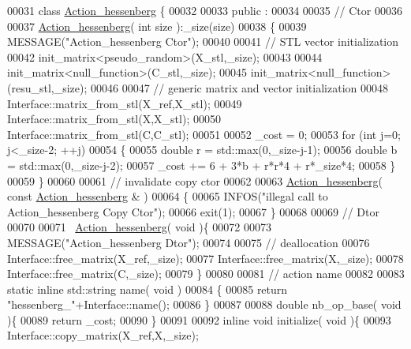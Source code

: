 \begin{DoxyCode}
00031 \textcolor{keyword}{class }\hyperlink{class_action__hessenberg}{Action\_hessenberg} \{
00032 
00033 public :
00034 
00035   \textcolor{comment}{// Ctor}
00036 
00037   \hyperlink{class_action__hessenberg}{Action\_hessenberg}( \textcolor{keywordtype}{int} size ):\_size(size)
00038   \{
00039     MESSAGE(\textcolor{stringliteral}{"Action\_hessenberg Ctor"});
00040 
00041     \textcolor{comment}{// STL vector initialization}
00042     init\_matrix<pseudo\_random>(X\_stl,\_size);
00043 
00044     init\_matrix<null\_function>(C\_stl,\_size);
00045     init\_matrix<null\_function>(resu\_stl,\_size);
00046 
00047     \textcolor{comment}{// generic matrix and vector initialization}
00048     Interface::matrix\_from\_stl(X\_ref,X\_stl);
00049     Interface::matrix\_from\_stl(X,X\_stl);
00050     Interface::matrix\_from\_stl(C,C\_stl);
00051 
00052     \_cost = 0;
00053     \textcolor{keywordflow}{for} (\textcolor{keywordtype}{int} j=0; j<\_size-2; ++j)
00054     \{
00055       \textcolor{keywordtype}{double} r = std::max(0,\_size-j-1);
00056       \textcolor{keywordtype}{double} b = std::max(0,\_size-j-2);
00057       \_cost += 6 + 3*b + r*r*4 + r*\_size*4;
00058     \}
00059   \}
00060 
00061   \textcolor{comment}{// invalidate copy ctor}
00062 
00063   \hyperlink{class_action__hessenberg}{Action\_hessenberg}( \textcolor{keyword}{const}  \hyperlink{class_action__hessenberg}{Action\_hessenberg} & )
00064   \{
00065     INFOS(\textcolor{stringliteral}{"illegal call to Action\_hessenberg Copy Ctor"});
00066     exit(1);
00067   \}
00068 
00069   \textcolor{comment}{// Dtor}
00070 
00071   ~\hyperlink{class_action__hessenberg}{Action\_hessenberg}( \textcolor{keywordtype}{void} )\{
00072 
00073     MESSAGE(\textcolor{stringliteral}{"Action\_hessenberg Dtor"});
00074 
00075     \textcolor{comment}{// deallocation}
00076     Interface::free\_matrix(X\_ref,\_size);
00077     Interface::free\_matrix(X,\_size);
00078     Interface::free\_matrix(C,\_size);
00079   \}
00080 
00081   \textcolor{comment}{// action name}
00082 
00083   \textcolor{keyword}{static} \textcolor{keyword}{inline} std::string name( \textcolor{keywordtype}{void} )
00084   \{
00085     \textcolor{keywordflow}{return} \textcolor{stringliteral}{"hessenberg\_"}+Interface::name();
00086   \}
00087 
00088   \textcolor{keywordtype}{double} nb\_op\_base( \textcolor{keywordtype}{void} )\{
00089     \textcolor{keywordflow}{return} \_cost;
00090   \}
00091 
00092   \textcolor{keyword}{inline} \textcolor{keywordtype}{void} initialize( \textcolor{keywordtype}{void} )\{
00093     Interface::copy\_matrix(X\_ref,X,\_size);

\end{DoxyCode}
